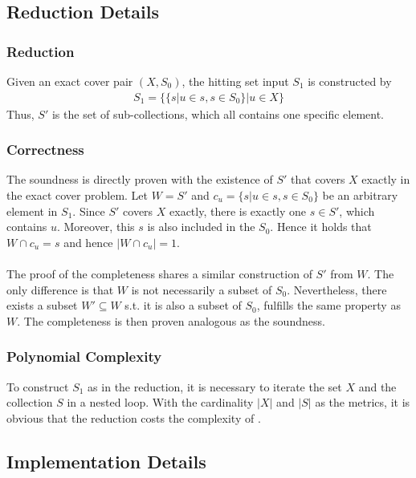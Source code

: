 \subsection{Reduction Details}
\subsubsection{Reduction}
Given an exact cover pair $(X, S_0)$, the hitting set input $S_1$ is constructed by 
\begin{align*}
    S_1 = \{\{s | u \in s, s \in S_0 \} | u \in X\}
\end{align*}
Thus, $S'$ is the set of sub-collections, which all contains one specific element. 

\subsubsection{Correctness}
The soundness is directly proven with the existence of $S'$ that covers $X$ exactly in the exact cover problem. 
Let $W = S'$ and $c_u = \{s | u \in s, s \in S_0 \}$ be an arbitrary element in $S_1$. 
Since $S'$ covers $X$ exactly, there is exactly one $s \in S'$, which contains $u$. Moreover, this $s$
is also included in the $S_0$. Hence it holds that $W \cap c_u = s$ and hence $|W \cap c_u| = 1$. \\\\
The proof of the completeness shares a similar construction of $S'$ from $W$. The only difference is that $W$ is not 
necessarily a subset of $S_0$. Nevertheless, there exists a subset $W' \subseteq W$ s.t. it is also a subset of $S_0$,
fulfills the same property as $W$. The completeness is then proven analogous as the soundness. 

\subsubsection*{Polynomial Complexity}
To construct $S_1$ as in the reduction, it is necessary to iterate the set $X$ and the collection $S$ in a nested loop. 
With the cardinality $|X|$ and $|S|$ as the metrics, it is obvious that the reduction costs the complexity of .

\subsection{Implementation Details}
